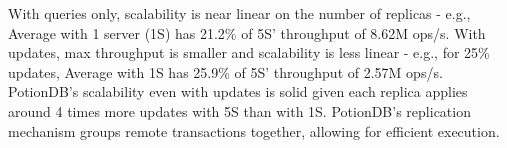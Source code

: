 \documentclass[sigconf, nonacm]{acmart}
\begin{document}
With queries only, scalability is near linear on the number of replicas - e.g., Average with 1 server (1S) has 21.2\% of 5S' throughput of 8.62M ops/s.
With updates, max throughput is smaller and scalability is less linear - e.g., for 25\% updates, Average with 1S has 25.9\% of 5S' throughput of 2.57M ops/s.
PotionDB's scalability even with updates is solid given each replica applies around 4 times more updates with 5S than with 1S.
PotionDB's replication mechanism groups remote transactions together, allowing for efficient execution.
\end{document}
